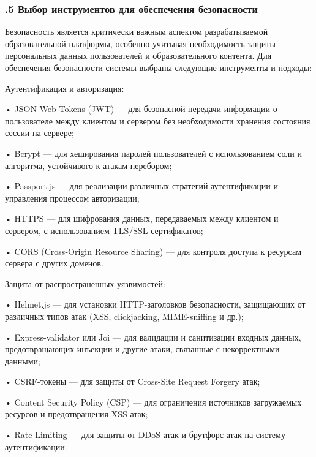 \subtitlespace

\subsubsection*{ 
  \gostTitleFont
  .5 Выбор инструментов для обеспечения безопасности
} 

\subtitlespace

{\gostFont

  \par \redline Безопасность является критически важным аспектом разрабатываемой образовательной платформы, особенно учитывая необходимость защиты персональных данных пользователей и образовательного контента. Для обеспечения безопасности системы выбраны следующие инструменты и подходы:

  \par \redline Аутентификация и авторизация:

  \par \redline • JSON Web Tokens (JWT) — для безопасной передачи информации о пользователе между клиентом и сервером без необходимости хранения состояния сессии на сервере;
  \par \redline • Bcrypt — для хеширования паролей пользователей с использованием соли и алгоритма, устойчивого к атакам перебором;
  \par \redline • Passport.js — для реализации различных стратегий аутентификации и управления процессом авторизации;
  \par \redline • HTTPS — для шифрования данных, передаваемых между клиентом и сервером, с использованием TLS/SSL сертификатов;
  \par \redline • CORS (Cross-Origin Resource Sharing) — для контроля доступа к ресурсам сервера с других доменов.

  \par \redline Защита от распространенных уязвимостей:

  \par \redline • Helmet.js — для установки HTTP-заголовков безопасности, защищающих от различных типов атак (XSS, clickjacking, MIME-sniffing и др.);
  \par \redline • Express-validator или Joi — для валидации и санитизации входных данных, предотвращающих инъекции и другие атаки, связанные с некорректными данными;
  \par \redline • CSRF-токены — для защиты от Cross-Site Request Forgery атак;
  \par \redline • Content Security Policy (CSP) — для ограничения источников загружаемых ресурсов и предотвращения XSS-атак;
  \par \redline • Rate Limiting — для защиты от DDoS-атак и брутфорс-атак на систему аутентификации.

}
